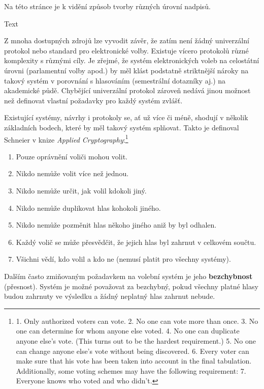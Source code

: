 Na této stránce je k vidění způsob tvorby různých úrovní nadpisů.

Text

\label{section:pozadavky}
Z mnoha dostupných zdrojů lze vyvodit závěr, že zatím není žádný univerzální protokol nebo standard pro elektronické volby. Existuje vícero protokolů různé komplexity s různými cíly. Je zřejmé, že systém elektronických voleb na celostátní úrovni (parlamentní volby apod.) by měl klást podstatně striktnější nároky na takový systém v porovnání s hlasováním (semestrální dotazníky aj.)  na akademické půdě. Chybějící univerzální protokol zároveň nedává jinou možnost než definovat vlastní požadavky pro každý systém zvlášť.

Existující systémy, návrhy i protokoly se, ať už více či méně, shodují v několik základních bodech, které by měl takový systém splňovat. Takto je definoval Schneier\cite{Schneier1996} v knize \textit{Applied Cryptography}:\footnote{
1. Only authorized voters can vote.
2. No one can vote more than once.
3. No one can determine for whom anyone else voted.
4. No one can duplicate anyone else’s vote. (This turns out to be the
hardest requirement.)
5. No one can change anyone else’s vote without being discovered.
6. Every voter can make sure that his vote has been taken into account
in the final tabulation.
Additionally, some voting schemes may have the following requirement:
7. Everyone knows who voted and who didn’t.\cite{Schneier1996}
}
\begin{enumerate}
	\item Pouze oprávnění voliči mohou volit.
	\item Nikdo nemůže volit více než jednou.
	\item Nikdo nemůže určit, jak volil kdokoli jiný.
	\item Nikdo nemůže duplikovat hlas kohokoli jiného.
	\item Nikdo nemůže pozměnit hlas někoho jiného aniž by byl odhalen.
	\item Každý volič se může přesvědčit, že jejich hlas byl zahrnut v celkovém součtu.
	\item Všichni vědí, kdo volil a kdo ne (nemusí platit pro všechny systémy).
\end{enumerate}


Dalším často zmiňovaným požadavkem na volební systém je jeho \textbf{bezchybnost} (přesnost). Systém je možné považovat za bezchybný, pokud všechny platné hlasy budou zahrnuty ve výsledku a žádný neplatný hlas zahrnut nebude.\cite{4285237}\cite{QADAH2007376}\cite{10.1007/978-3-642-03315-5_13}

